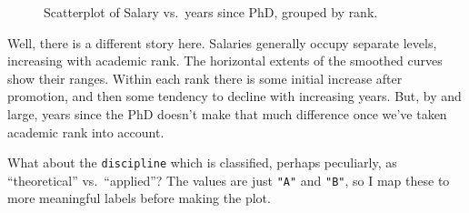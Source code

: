 \documentclass[
  letterpaper,
  10pt,
  krantz2]{krantz}
\begin{document}
\begin{figure}[H]


\caption{\label{fig-Salaries-rank}Scatterplot of Salary vs.~years since
PhD, grouped by rank.}

\end{figure}%

Well, there is a different story here. Salaries generally occupy
separate levels, increasing with academic rank. The horizontal extents
of the smoothed curves show their ranges. Within each rank there is some
initial increase after promotion, and then some tendency to decline with
increasing years. But, by and large, years since the PhD doesn't make
that much difference once we've taken academic rank into account.

What about the \texttt{discipline} which is classified, perhaps
peculiarly, as ``theoretical'' vs.~``applied''? The values are just
\texttt{"A"} and \texttt{"B"}, so I map these to more meaningful labels
before making the plot.
\end{document}
